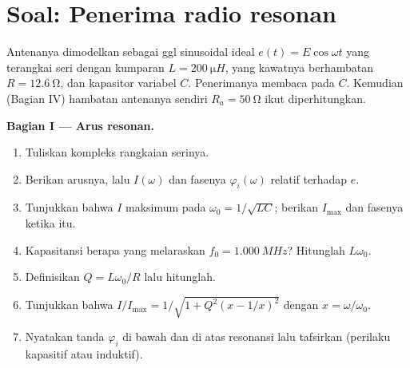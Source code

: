\section{Soal: Penerima radio resonan}

\begin{problem}
\label{pb:b1:sinusoidal-impedance:1}
Antenanya dimodelkan sebagai ggl sinusoidal ideal $e(t) = E\cos\omega t$
yang terangkai seri dengan kumparan $L = \qty{200}{\micro H}$, yang
kawatnya berhambatan $R = \qty{12.6}{\ohm}$, dan kapasitor variabel $C$.
Penerimanya membaca  pada $C$. Kemudian (Bagian IV) hambatan
antenanya sendiri $R_a = \qty{50}{\ohm}$ ikut diperhitungkan.

\medskip
\noindent\textbf{Bagian I --- Arus resonan.}
\begin{enumerate}
  \item Tuliskan  kompleks rangkaian serinya.
  \item Berikan  arusnya, lalu 
        $I(\omega)$ dan fasenya $\varphi_i(\omega)$ relatif terhadap $e$.
  \item Tunjukkan bahwa $I$ maksimum pada $\omega_0 = 1/\sqrt{LC}$;
        berikan $I_{\max}$ dan fasenya ketika itu.
  \item Kapasitansi berapa yang melaraskan $f_0 = \qty{1.000}{MHz}$?
        Hitunglah $L\omega_0$.
  \item Definisikan $Q = L\omega_0/R$ lalu hitunglah.
  \item Tunjukkan bahwa $I/I_{\max} = 1/\sqrt{1 + Q^2(x - 1/x)^2}$ dengan
        $x = \omega/\omega_0$.
  \item Nyatakan tanda $\varphi_i$ di bawah dan di atas resonansi lalu
        tafsirkan (perilaku kapasitif atau induktif).
\end{enumerate}


\end{problem}
